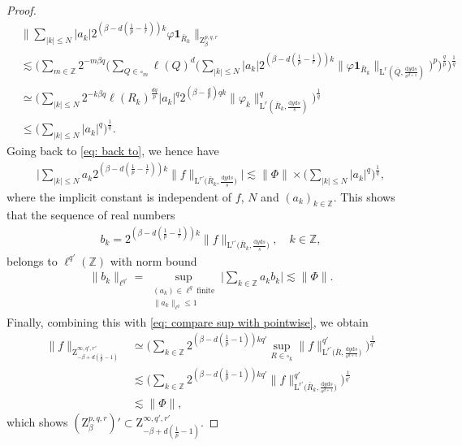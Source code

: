 \documentclass[10pt,a4paper]{amsart}
\newcommand{\IZ}{\mathbb{Z}}
\renewcommand{\L}{\mathrm{L}}
\newcommand{\Z}{\mathrm{Z}}
\renewcommand{\d}{\mathrm{d}}
\newcommand{\ind}{{\mathbf{1}}}
\begin{document}
\begin{proof}
\begin{align*}
       &\bigg\|\sum\limits_{|k|\leq N} |a_k|2^{(\beta-d(\frac{1}{p}-\frac{1}{r}))k}\varphi \ind_{\bar R_k} \bigg\|_{\Z^{p,q,r}_\beta} \\
       &\lesssim \Big(\sum\limits_{m\in\IZ} 2^{-m\beta q} \Big(\sum\limits_{Q\in\square_m} \ell(Q)^d \Big( \sum\limits_{|k|\leq N} |a_k|2^{(\beta-d(\frac{1}{p}-\frac{1}{r}))k} \|\varphi \ind_{\bar R_k} \|_{\L^r(\bar Q,\frac{\d y \d s}{s^{d+1}})} \Big)^p \Big)^\frac{q}{p} \Big)^\frac{1}{q}\\
       &\simeq \Big(\sum\limits_{|k|\leq N} 2^{-k\beta q} \ell(R_k)^\frac{dq}{p}  |a_k|^q2^{(\beta-\frac{d}{p})qk} \|\varphi_k\|^q_{\L^r(\bar R_k,\frac{\d y \d s}{s})}  \Big)^\frac{1}{q}\\
       &\leq \Big(\sum\limits_{|k|\leq N}  |a_k|^q \Big)^\frac{1}{q}.
    \end{align*}
    Going back to \eqref{eq: back to}, we hence have
    \begin{align*}
        \Big|\sum\limits_{|k|\leq N} a_k2^{(\beta-d(\frac{1}{p}-\frac{1}{r}))k}  \|f\|_{\L^{r'}\big(\bar R_k,\frac{\d y \d s}{s}\big)}\Big|\lesssim \|\Phi\|\times \Big(\sum\limits_{|k|\leq N}  |a_k|^q \Big)^\frac{1}{q},
    \end{align*}
    where the implicit constant is independent of $f$, $N$ and $(a_k)_{k\in\IZ}$. This shows that the sequence of real numbers
    \begin{align*}
        b_k = 2^{(\beta-d(\frac{1}{p}-\frac{1}{r}))k}  \|f\|_{\L^{r'}\big(\bar R_k,\frac{\d y \d s}{s}\big)}, \quad k\in\IZ,
    \end{align*}
    belongs to $\ell^{q'}(\IZ)$ with norm bound
    \begin{align*}
        \|b_k\|_{\ell^{q'}} = \sup\limits_{\substack{(a_k)\in \ell^{q}\ \text{finite}\\
        \|a_k\|_{\ell^q}\leq 1}}\Big|\sum\limits_{k\in\IZ} a_k b_k\Big|\lesssim \|\Phi\|.
    \end{align*}
    Finally, combining this with \eqref{eq: compare sup with pointwise}, we obtain
    \begin{align*}
        \|f\|_{\Z^{\infty,q',r'}_{-\beta+d(\frac{1}{p}-1)}} &\simeq\Big(\sum\limits_{k\in\IZ} 2^{(\beta-d(\frac{1}{p}-1))kq'}  \sup\limits_{R\in\square_k}\|f\|^{q'}_{\L^{r'}\big(\bar R,\frac{\d y \d s}{s^{d+1}}\big)}\Big)^\frac{1}{q'}\\
        &\lesssim\Big(\sum\limits_{k\in\IZ} 2^{(\beta-d(\frac{1}{p}-1))kq'}  \|f\|^{q'}_{\L^{r'}\big(\bar R_k,\frac{\d y \d s}{s^{d+1}}\big)}\Big)^\frac{1}{q'}\\
        &\lesssim \|\Phi\|,
    \end{align*}
    which shows $(\Z^{p,q,r}_\beta)'\subset  \Z^{\infty,q',r'}_{-\beta+d(\frac{1}{p}-1)}$.
\end{proof}
\end{document}
